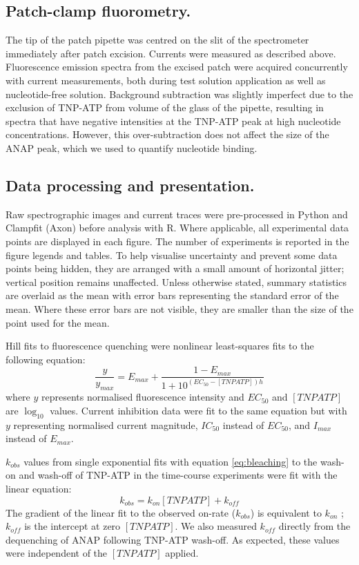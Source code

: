 \documentclass[9pt,lineno, onehalfspacing]{elife_modified}
\begin{document}
\subsection{Patch-clamp fluorometry.}
The tip of the patch pipette was centred on the slit of the spectrometer immediately after patch excision.
Currents were measured as described above.
Fluorescence emission spectra from the excised patch were acquired concurrently with current measurements, both during test solution application as well as nucleotide-free solution.
Background subtraction was slightly imperfect due to the exclusion of TNP-ATP from volume of the glass of the pipette, resulting in spectra that have negative intensities at the TNP-ATP peak at high nucleotide concentrations.
However, this over-subtraction does not affect the size of the ANAP peak, which we used to quantify nucleotide binding.

\subsection{Data processing and presentation.}
Raw spectrographic images and current traces were pre-processed in Python and Clampfit (Axon) before analysis with R.
Where applicable, all experimental data points are displayed in each figure.
The number of experiments is reported in the figure legends and tables.
To help visualise uncertainty and prevent some data points being hidden, they are arranged with a small amount of horizontal jitter; vertical position remains unaffected.
Unless otherwise stated, summary statistics are overlaid as the mean with error bars representing the standard error of the mean.
Where these error bars are not visible, they are smaller than the size of the point used for the mean.

Hill fits to fluorescence quenching were nonlinear least-squares fits to the following equation:
\begin{equation} \label{eq:hill}
    \frac{y}{y_{max}} = E_{max} + \frac{1 - E_{max}}{1 + 10^{(EC_{50} - [TNPATP])h}}
\end{equation}
where $y$ represents normalised fluorescence intensity and $EC_{50}$ and $[TNPATP]$ are $\log_{10}$ values.
Current inhibition data were fit to the same equation but with $y$ representing normalised current magnitude, $IC_{50}$ instead of $EC_{50}$, and $I_{max}$ instead of $E_{max}$.

$k_{obs}$ values from single exponential fits with equation \ref{eq:bleaching} to the wash-on and wash-off of TNP-ATP in the time-course experiments were fit with the linear equation:
\begin{equation} \label{eq:kinetics}
    k_{obs} = k_{on}[TNPATP] + k_{off}
\end{equation}
The gradient of the linear fit to the observed on-rate ($k_{obs}$) is equivalent to $k_{on}$ ; $k_{off}$  is the intercept at zero $[TNPATP]$.
We also measured $k_{off}$  directly from the dequenching of ANAP following TNP-ATP wash-off.
As expected, these values were independent of the $[TNPATP]$ applied.
\end{document}
